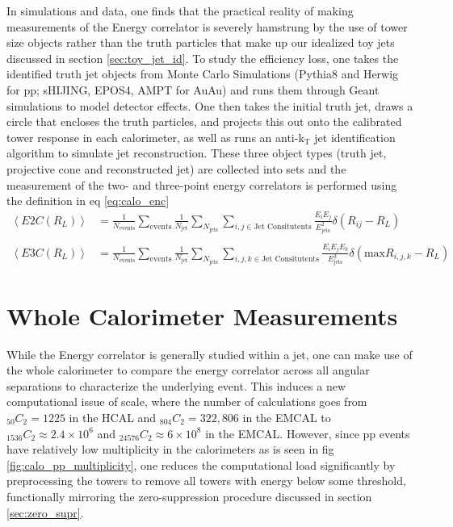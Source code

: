 \documentclass[letterpaper, 12pt, oneside]{book}
\theoremstyle{definition}
\begin{document}
	In simulations and data, one finds that the practical reality of making measurements of the Energy correlator is severely hamstrung by the use of tower size objects rather than the truth particles that make up our idealized toy jets discussed in section \ref{sec:toy_jet_id}. 
	To study the efficiency loss, one takes the identified truth jet objects from Monte Carlo Simulations (Pythia8 and Herwig for pp; sHIJING, EPOS4, AMPT for AuAu) and runs them through Geant simulations to model detector effects.
	One then takes the initial truth jet, draws a circle that encloses the truth particles, and projects this out onto the calibrated tower response in each calorimeter, as well as runs an anti-k$_{\textrm{T}}$ jet identification algorithm to simulate jet reconstruction.
	These three object types (truth jet, projective cone and reconstructed jet) are collected into sets and the measurement of the two- and three-point energy correlators is performed using the definition in eq \ref{eq:calo_enc}
	\begin{equation}
		\begin{split}
			\left< E2C \left( R_L \right) \right> &= \frac{1}{N_\textrm{events}} \sum_{\textrm{events}} \frac{1}{N_\textrm{jet}} \sum_{N_{\textrm{jets}}} \sum_{i,j \in \textrm{Jet Consitutents}} \frac{E_{i} E_{j}}{E_\textrm{jets}^2} \delta \left( R_{ij} - R_L \right) \\  \\
			\left< E3C \left( R_L \right) \right> &= \frac{1}{N_\textrm{events}} \sum_{\textrm{events}} \frac{1}{N_\textrm{jet}} \sum_{N_{\textrm{jets}}} \sum_{i,j,k \in \textrm{Jet Consitutents}} \frac{E_{i} E_{j} E_{k}}{E_\textrm{jets}^3} \delta \left( \textrm{max}{R_{i,j,k}} - R_L \right) 
		\end{split}
		\label{eq:calo_enc}
	\end{equation}
	
	\section{Whole Calorimeter Measurements}
	While the Energy correlator is generally studied within a jet, one can make use of the whole calorimeter to compare the energy correlator across all angular separations to characterize the underlying event. 
	This induces a new computational issue of scale, where the number of calculations goes from $_{50}C_2=1225$ in the HCAL and $_{804} C_2=322,806$ in the EMCAL to $_{1536}C_2 \approx 2.4 \times 10^6$ and $_{24576}C_2 \approx 6 \times 10^8$ in the EMCAL.
	However, since pp events have relatively low multiplicity in the calorimeters as is seen in fig \ref{fig:calo_pp_multiplicity}, one reduces the computational load significantly by preprocessing the towers to remove all towers with energy below some threshold, functionally mirroring the zero-suppression procedure discussed in section \ref{sec:zero_supr}.
\end{document}
